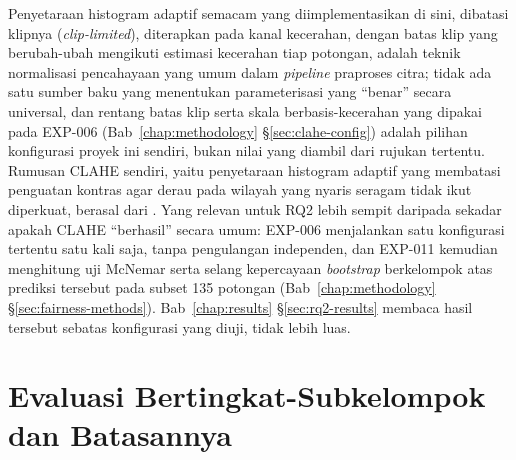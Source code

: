 Penyetaraan histogram adaptif semacam yang diimplementasikan di sini, dibatasi klipnya (\textit{clip-limited}), diterapkan pada kanal kecerahan, dengan batas klip yang berubah-ubah mengikuti estimasi kecerahan tiap potongan, adalah teknik normalisasi pencahayaan yang umum dalam \textit{pipeline} praproses citra; tidak ada satu sumber baku yang menentukan parameterisasi yang ``benar'' secara universal, dan rentang batas klip serta skala berbasis-kecerahan yang dipakai pada EXP-006 (Bab~\ref{chap:methodology} \S\ref{sec:clahe-config}) adalah pilihan konfigurasi proyek ini sendiri, bukan nilai yang diambil dari rujukan tertentu. Rumusan CLAHE sendiri, yaitu penyetaraan histogram adaptif yang membatasi penguatan kontras agar derau pada wilayah yang nyaris seragam tidak ikut diperkuat, berasal dari \citet{zuiderveld1994clahe}. Yang relevan untuk RQ2 lebih sempit daripada sekadar apakah CLAHE ``berhasil'' secara umum: EXP-006 menjalankan satu konfigurasi tertentu satu kali saja, tanpa pengulangan independen, dan EXP-011 kemudian menghitung uji McNemar serta selang kepercayaan \textit{bootstrap} berkelompok atas prediksi tersebut pada subset 135 potongan (Bab~\ref{chap:methodology} \S\ref{sec:fairness-methods}). Bab~\ref{chap:results} \S\ref{sec:rq2-results} membaca hasil tersebut sebatas konfigurasi yang diuji, tidak lebih luas.

\section{Evaluasi Bertingkat-Subkelompok dan Batasannya}
\label{sec:lit-subgroup}

